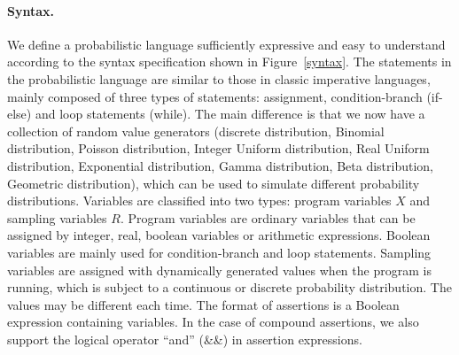 \documentclass[runningheads]{llncs}
\begin{document}
\paragraph{Syntax.} We define a probabilistic language sufficiently expressive and easy to understand according to the syntax specification shown in Figure~\ref{syntax}. The statements in the probabilistic language are similar to those in classic imperative languages, mainly composed of three types of statements: assignment, condition-branch (if-else) and loop statements (while). The main difference is that we now have a collection of random value generators (discrete distribution, Binomial distribution, Poisson distribution, Integer Uniform distribution, Real Uniform distribution, Exponential distribution, Gamma distribution, Beta distribution, Geometric distribution), which can be used to simulate different probability distributions. Variables are classified into two types: program variables $X$ and sampling variables $R$. Program variables are ordinary variables that can be assigned by integer, real, boolean variables or arithmetic expressions. Boolean variables are mainly used for condition-branch and loop statements. Sampling variables are assigned with dynamically generated values when the program is running, which is subject to a continuous or discrete probability distribution. The values may be different each time. %
The format of assertions is a Boolean expression containing variables. %
In the case of compound assertions, we also support the logical operator ``and'' (\&\&) in assertion expressions.
\end{document}
